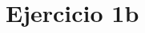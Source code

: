 \documentclass[13pt]{beamer}
\begin{document}
		 
	 






    \section{Ejercicio 1b}
\end{document}
